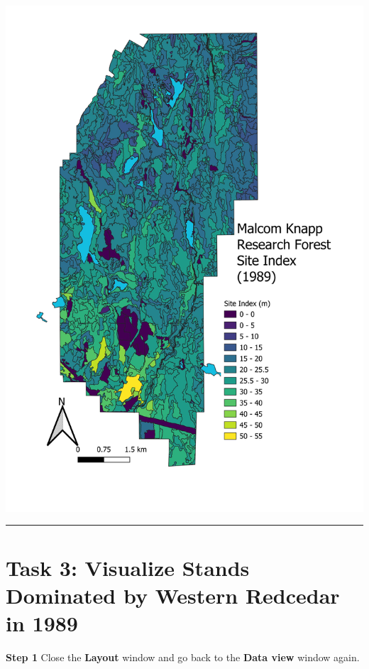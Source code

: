 \documentclass[
  letterpaper,
]{book}
\begin{document}
\includegraphics{images/Map1.jpg}

\begin{center}\rule{0.5\linewidth}{0.5pt}\end{center}

\hypertarget{task-3-visualize-stands-dominated-by-western-redcedar-in-1989}{%
\section*{Task 3: Visualize Stands Dominated by Western Redcedar in
1989}\label{task-3-visualize-stands-dominated-by-western-redcedar-in-1989}}


\textbf{Step 1} Close the \textbf{Layout} window and go back to the
\textbf{Data view} window again.
\end{document}
